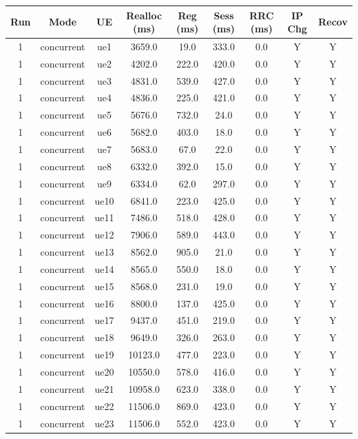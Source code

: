 \begin{table}[ht]
\centering
\begin{tabular}{|c|c|c|c|c|c|c|c|c|}
\hline
Run & Mode & UE & Realloc (ms) & Reg (ms) & Sess (ms) & RRC (ms) & IP Chg & Recov \\
\hline
1 & concurrent & ue1 & 3659.0 & 19.0 & 333.0 & 0.0 & Y & Y \\
1 & concurrent & ue2 & 4202.0 & 222.0 & 420.0 & 0.0 & Y & Y \\
1 & concurrent & ue3 & 4831.0 & 539.0 & 427.0 & 0.0 & Y & Y \\
1 & concurrent & ue4 & 4836.0 & 225.0 & 421.0 & 0.0 & Y & Y \\
1 & concurrent & ue5 & 5676.0 & 732.0 & 24.0 & 0.0 & Y & Y \\
1 & concurrent & ue6 & 5682.0 & 403.0 & 18.0 & 0.0 & Y & Y \\
1 & concurrent & ue7 & 5683.0 & 67.0 & 22.0 & 0.0 & Y & Y \\
1 & concurrent & ue8 & 6332.0 & 392.0 & 15.0 & 0.0 & Y & Y \\
1 & concurrent & ue9 & 6334.0 & 62.0 & 297.0 & 0.0 & Y & Y \\
1 & concurrent & ue10 & 6841.0 & 223.0 & 425.0 & 0.0 & Y & Y \\
1 & concurrent & ue11 & 7486.0 & 518.0 & 428.0 & 0.0 & Y & Y \\
1 & concurrent & ue12 & 7906.0 & 589.0 & 443.0 & 0.0 & Y & Y \\
1 & concurrent & ue13 & 8562.0 & 905.0 & 21.0 & 0.0 & Y & Y \\
1 & concurrent & ue14 & 8565.0 & 550.0 & 18.0 & 0.0 & Y & Y \\
1 & concurrent & ue15 & 8568.0 & 231.0 & 19.0 & 0.0 & Y & Y \\
1 & concurrent & ue16 & 8800.0 & 137.0 & 425.0 & 0.0 & Y & Y \\
1 & concurrent & ue17 & 9437.0 & 451.0 & 219.0 & 0.0 & Y & Y \\
1 & concurrent & ue18 & 9649.0 & 326.0 & 263.0 & 0.0 & Y & Y \\
1 & concurrent & ue19 & 10123.0 & 477.0 & 223.0 & 0.0 & Y & Y \\
1 & concurrent & ue20 & 10550.0 & 578.0 & 416.0 & 0.0 & Y & Y \\
1 & concurrent & ue21 & 10958.0 & 623.0 & 338.0 & 0.0 & Y & Y \\
1 & concurrent & ue22 & 11506.0 & 869.0 & 423.0 & 0.0 & Y & Y \\
1 & concurrent & ue23 & 11506.0 & 552.0 & 423.0 & 0.0 & Y & Y \\

\end{tabular}
\end{table}
